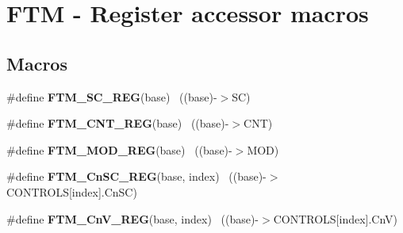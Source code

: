 \hypertarget{group___f_t_m___register___accessor___macros}{}\section{F\+T\+M -\/ Register accessor macros}
\label{group___f_t_m___register___accessor___macros}
\subsection*{Macros}
\begin{DoxyCompactItemize}
\item 
\hypertarget{group___f_t_m___register___accessor___macros_ga0b48df6cbccecf754cc49bb7ea1e3aad}{}\#define {\bfseries F\+T\+M\+\_\+\+S\+C\+\_\+\+R\+E\+G}(base)                                              ~((base)-\/$>$S\+C)\label{group___f_t_m___register___accessor___macros_ga0b48df6cbccecf754cc49bb7ea1e3aad}

\item 
\hypertarget{group___f_t_m___register___accessor___macros_ga1ba1654f76ecc24de48047117cb5b45e}{}\#define {\bfseries F\+T\+M\+\_\+\+C\+N\+T\+\_\+\+R\+E\+G}(base)                                            ~((base)-\/$>$C\+N\+T)\label{group___f_t_m___register___accessor___macros_ga1ba1654f76ecc24de48047117cb5b45e}

\item 
\hypertarget{group___f_t_m___register___accessor___macros_gabbea5752afc54317fcb50890f8593a49}{}\#define {\bfseries F\+T\+M\+\_\+\+M\+O\+D\+\_\+\+R\+E\+G}(base)                                            ~((base)-\/$>$M\+O\+D)\label{group___f_t_m___register___accessor___macros_gabbea5752afc54317fcb50890f8593a49}

\item 
\hypertarget{group___f_t_m___register___accessor___macros_ga49332bccc11dd36d399f3fff66f313b5}{}\#define {\bfseries F\+T\+M\+\_\+\+Cn\+S\+C\+\_\+\+R\+E\+G}(base,  index)                              ~((base)-\/$>$C\+O\+N\+T\+R\+O\+L\+S\mbox{[}index\mbox{]}.Cn\+S\+C)\label{group___f_t_m___register___accessor___macros_ga49332bccc11dd36d399f3fff66f313b5}

\item 
\hypertarget{group___f_t_m___register___accessor___macros_gaacf8fed24da463653900319184874197}{}\#define {\bfseries F\+T\+M\+\_\+\+Cn\+V\+\_\+\+R\+E\+G}(base,  index)                                ~((base)-\/$>$C\+O\+N\+T\+R\+O\+L\+S\mbox{[}index\mbox{]}.Cn\+V)\label{group___f_t_m___register___accessor___macros_gaacf8fed24da463653900319184874197}


\end{DoxyCompactItemize}
